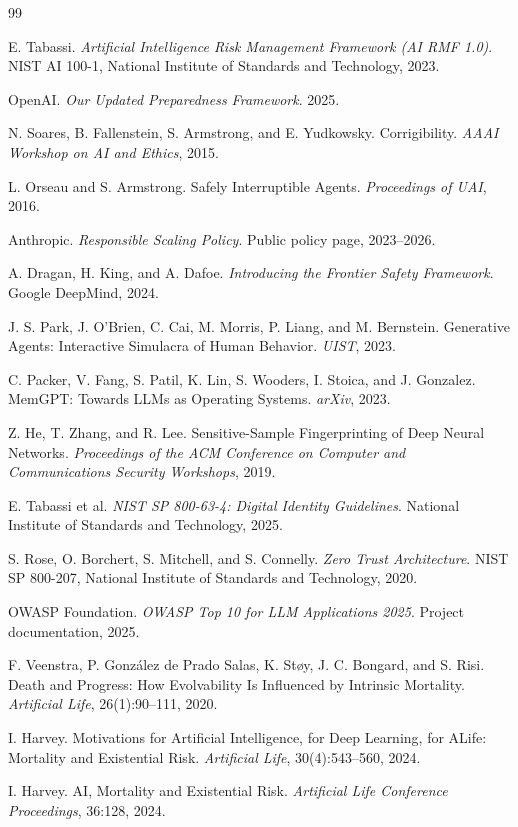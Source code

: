 \documentclass[11pt]{article}
\begin{document}
\begingroup
\sloppy
\begin{thebibliography}{99}

E. Tabassi.
\textit{Artificial Intelligence Risk Management Framework (AI RMF 1.0)}.
NIST AI 100-1, National Institute of Standards and Technology, 2023.

OpenAI.
\textit{Our Updated Preparedness Framework}.
2025.

N. Soares, B. Fallenstein, S. Armstrong, and E. Yudkowsky.
Corrigibility.
\textit{AAAI Workshop on AI and Ethics}, 2015.

L. Orseau and S. Armstrong.
Safely Interruptible Agents.
\textit{Proceedings of UAI}, 2016.

Anthropic.
\textit{Responsible Scaling Policy}.
Public policy page, 2023--2026.

A. Dragan, H. King, and A. Dafoe.
\textit{Introducing the Frontier Safety Framework}.
Google DeepMind, 2024.

J. S. Park, J. O'Brien, C. Cai, M. Morris, P. Liang, and M. Bernstein.
Generative Agents: Interactive Simulacra of Human Behavior.
\textit{UIST}, 2023.

C. Packer, V. Fang, S. Patil, K. Lin, S. Wooders, I. Stoica, and J. Gonzalez.
MemGPT: Towards LLMs as Operating Systems.
\textit{arXiv}, 2023.

Z. He, T. Zhang, and R. Lee.
Sensitive-Sample Fingerprinting of Deep Neural
Networks.
\textit{Proceedings of the ACM Conference on Computer and Communications Security Workshops}, 2019.

E. Tabassi et al.
\textit{NIST SP 800-63-4: Digital Identity Guidelines}.
National Institute of Standards and Technology, 2025.

S. Rose, O. Borchert, S. Mitchell, and S. Connelly.
\textit{Zero Trust Architecture}.
NIST SP 800-207, National Institute of Standards and Technology, 2020.

OWASP Foundation.
\textit{OWASP Top 10 for LLM Applications 2025}.
Project documentation, 2025.

F. Veenstra, P. Gonz\'alez de Prado Salas, K. St{\o}y, J. C. Bongard, and S. Risi.
Death and Progress: How Evolvability Is Influenced by Intrinsic Mortality.
\textit{Artificial Life}, 26(1):90--111, 2020.

I. Harvey.
Motivations for Artificial Intelligence, for Deep Learning, for ALife: Mortality and Existential Risk.
\textit{Artificial Life}, 30(4):543--560, 2024.

I. Harvey.
AI, Mortality and Existential Risk.
\textit{Artificial Life Conference Proceedings}, 36:128, 2024.

\end{thebibliography}
\endgroup
\end{document}
